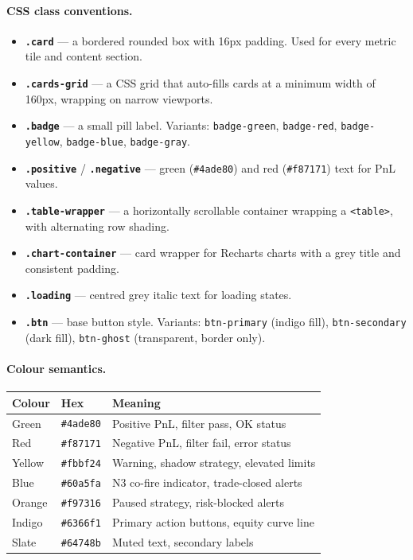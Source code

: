 \documentclass[12pt, a4paper]{article}
\begin{document}
\paragraph{CSS class conventions.}
\begin{itemize}[noitemsep]
  \item \textbf{\texttt{.card}} — a bordered rounded box with 16px padding.
        Used for every metric tile and content section.
  \item \textbf{\texttt{.cards-grid}} — a CSS grid that auto-fills cards
        at a minimum width of 160px, wrapping on narrow viewports.
  \item \textbf{\texttt{.badge}} — a small pill label. Variants:
        \texttt{badge-green}, \texttt{badge-red}, \texttt{badge-yellow},
        \texttt{badge-blue}, \texttt{badge-gray}.
  \item \textbf{\texttt{.positive}} / \textbf{\texttt{.negative}} — green
        (\texttt{\#4ade80}) and red (\texttt{\#f87171}) text for PnL values.
  \item \textbf{\texttt{.table-wrapper}} — a horizontally scrollable container
        wrapping a \texttt{<table>}, with alternating row shading.
  \item \textbf{\texttt{.chart-container}} — card wrapper for Recharts charts
        with a grey title and consistent padding.
  \item \textbf{\texttt{.loading}} — centred grey italic text for loading states.
  \item \textbf{\texttt{.btn}} — base button style. Variants:
        \texttt{btn-primary} (indigo fill), \texttt{btn-secondary}
        (dark fill), \texttt{btn-ghost} (transparent, border only).
\end{itemize}

\paragraph{Colour semantics.}
\begin{table}[H]
\centering\small
\begin{tabular}{lll}
\toprule
Colour & Hex & Meaning \\
\midrule
Green  & \texttt{\#4ade80} & Positive PnL, filter pass, OK status \\
Red    & \texttt{\#f87171} & Negative PnL, filter fail, error status \\
Yellow & \texttt{\#fbbf24} & Warning, shadow strategy, elevated limits \\
Blue   & \texttt{\#60a5fa} & N3 co-fire indicator, trade-closed alerts \\
Orange & \texttt{\#f97316} & Paused strategy, risk-blocked alerts \\
Indigo & \texttt{\#6366f1} & Primary action buttons, equity curve line \\
Slate  & \texttt{\#64748b} & Muted text, secondary labels \\
\bottomrule
\end{tabular}
\end{table}
\end{document}

